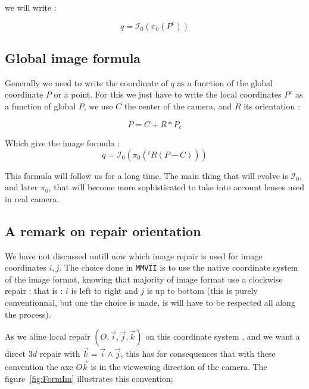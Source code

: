 we will write :

\begin{equation}
	q  =   \mathcal{I}_0 (\pi_0 (P^c))
\end{equation}


\subsection{Global image formula}

Generally we need to write the coordinate of $q$ as a function of the global coordinate $P$ or a point.
For this we just have to write the local coordinates $P^c$ as a function of global $P$, 
we use $C$ the center of the camera, and $R$ its orientation :

\begin{equation}
	P =  C+ R *P_c
\end{equation}

Which give the image formula :
\begin{equation}
	q  =   \mathcal{I}_0 (\pi_0 (^t R (P - C))) \label{FormImage0}
\end{equation}

This formula will follow us for a long time. The main thing that will evolve is $\mathcal{I}_0$,
and later $\pi_0$,
that will become more sophisticated to take into account lenses used in real camera.


\subsection{A remark on repair orientation}

We have not discussed untill now which image repair is used for image coordinates $i,j$.
The choice done in {\tt MMVII} is to use the native coordinate system of the image format,
knowing that majority of image format use a clockwise repair : 
that is : $i$ is left to right and $j$ is up to bottom (this is purely conventionnal, but one the
choice is made, is will have to be respected all along the process).

As we aline  local repair $(O,\vec{i},\vec{j},\vec{k})$  on this coordinate system ,
and we want a direct $3d$ repair with $\vec{k} = \vec{i} \wedge \vec{j} $, this
has for consequences that with these convention the axe $O\vec{k}$ is in the viewewing direction of the
camera.  The figure~\ref{fig:FormIm} illustrates this convention;


